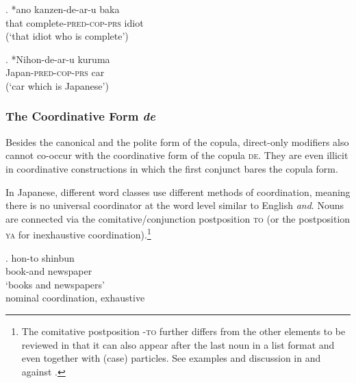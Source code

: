 \documentclass [output=book,colorlinks,citecolor=brown]{langscibook}
\begin{document}
\exg. *ano kanzen-de-ar-u baka\\
that complete-\textsc{pred-cop-prs} idiot\\
(`that idiot who is complete’) \null \hfill \citep[108]{ayano:2010:revisiting} \label{kanzen no cop}

\exg. *Nihon-de-ar-u kuruma\\
Japan-\textsc{pred-cop-prs} car\\
(`car which is Japanese’) \label{nihon no cop}

\subsubsection {The Coordinative Form \textit{de}} \label{coordination copula}

Besides the canonical and the polite form of the copula, direct-only modifiers also cannot co-occur with the coordinative form of the copula \textsc{de}. They are even illicit in coordinative constructions in which the first conjunct bares the copula form. %

In Japanese, different word classes use different methods of coordination, meaning there is no universal coordinator at the word level similar to English \textit{and}. Nouns are connected via the comitative/conjunction postposition \textsc{to} (or the postposition \textsc{ya} for inexhaustive coordination).\footnote{The comitative postposition -\textsc{to} further differs from the other elements to be reviewed in that it can also appear after the last noun in a list format and even together with (case) particles. See examples and discussion in \citet{kuno:1973:structure} and \citet{hiraiwa:2014:constraining} against \citet{tatsumi:2018:splitting}.}

\exg. hon-to shinbun\\
book-and newspaper\\
`books and newspapers' \\ \null \hfill nominal coordination, exhaustive
\end{document}
